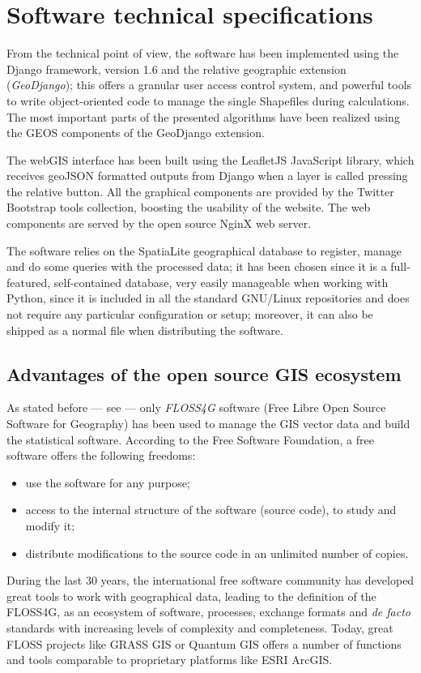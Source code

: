         \section{Software technical specifications}
            From the technical point of view, the software has been implemented using the Django framework, version 1.6 and the relative geographic extension (\emph{GeoDjango}); this offers a granular user access control system, and powerful tools to write object-oriented code to manage the single Shapefiles during calculations. The most important parts of the presented algorithms have been realized using the GEOS components of the GeoDjango extension.

            The webGIS interface has been built using the LeafletJS JavaScript library, which receives geoJSON formatted outputs from Django when a layer is called pressing the relative button. All the graphical components are provided by the Twitter Bootstrap tools collection, boosting the usability of the website. The web components are served by the open source NginX web server.
            
            The software relies on the SpatiaLite geographical database to register, manage and do some queries with the processed data; it has been chosen since it is a full-featured, self-contained database, very easily manageable when working with Python, since it is included in all the standard GNU/Linux repositories and does not require any particular configuration or setup; moreover, it can also be shipped as a normal file when distributing the software.

            \subsection{Advantages of the open source GIS ecosystem}
                As stated before --- see  --- only \emph{FLOSS4G} software (Free Libre Open Source Software for Geography) has been used to manage the GIS vector data and build the statistical software. According to the Free Software Foundation, %
                a free software offers the following freedoms:
                \begin{itemize}
                    \item use the software for any purpose;
                    \item access to the internal structure of the software (source code), to study and modify it;
                    \item distribute modifications to the source code in an unlimited number of copies.
                \end{itemize}
                During the last 30 years, the international free software community has developed great tools to work with geographical data, leading to the definition of the FLOSS4G, as an ecosystem of software, processes, exchange formats and \emph{de facto} standards with increasing levels of complexity and completeness. Today, great FLOSS projects like GRASS GIS or Quantum GIS offers a number of functions and tools comparable to proprietary platforms like ESRI ArcGIS.

